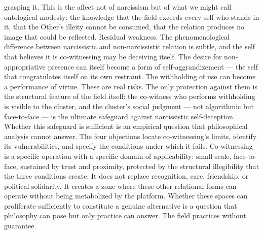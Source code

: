 grasping it. This is the affect not of narcissism but of what we might call ontological modesty: the knowledge that the field exceeds every self who stands in it, that the Other’s illeity cannot be consumed, that the relation produces no image that could be reflected. Residual weakness. The phenomenological difference between narcissistic and non-narcissistic relation is subtle, and the self that believes it is co-witnessing may be deceiving itself. The desire for non-appropriative presence can itself become a form of self-aggrandizement — the self that congratulates itself on its own restraint. The withholding of use can become a performance of virtue. These are real risks. The only protection against them is the structural feature of the field itself: the co-witness who performs withholding is visible to the cluster, and the cluster’s social judgment — not algorithmic but face-to-face — is the ultimate safeguard against narcissistic self-deception. Whether this safeguard is sufficient is an empirical question that philosophical analysis cannot answer. The four objections locate co-witnessing’s limits, identify its vulnerabilities, and specify the conditions under which it fails. Co-witnessing is a specific operation with a specific domain of applicability: small-scale, face-to-face, sustained by trust and proximity, protected by the structural illegibility that the three conditions create. It does not replace recognition, care, friendship, or political solidarity. It creates a zone where these other relational forms can operate without being metabolized by the platform. Whether these spaces can proliferate sufficiently to constitute a genuine alternative is a question that philosophy can pose but only practice can answer. The field practices without guarantee.
